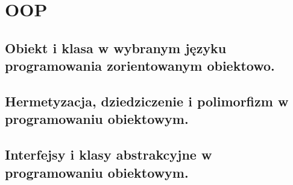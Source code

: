 \chapter{OOP}
\section{Obiekt i klasa w wybranym języku programowania zorientowanym obiektowo.}
\section{Hermetyzacja, dziedziczenie i polimorfizm w programowaniu obiektowym.}
\section{Interfejsy i klasy abstrakcyjne w programowaniu obiektowym.}